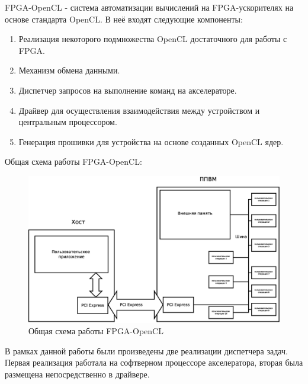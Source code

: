 FPGA-OpenCL - система автоматизации вычислений на FPGA-ускорителях на основе
 стандарта OpenCL. В неё входят следующие компоненты:
\begin{enumerate}
   \item Реализация некоторого подмножества OpenCL достаточного для работы с
   FPGA.
   \item Механизм обмена данными.
   \item Диспетчер запросов на выполнение команд на акселераторе.
   \item Драйвер для осуществления взаимодействия между устройством и
   центральным процессором.
   \item Генерация прошивки для устройства на основе созданных OpenCL ядер.
\end{enumerate}

Общая схема работы FPGA-OpenCL:

\begin{figure}[h!]
\includegraphics [width=\textwidth]{pictures/base-scheme}
\caption{Общая схема работы FPGA-OpenCL}
\label{fpga-cell}
\end{figure}

В рамках данной работы были произведены две реализации диспетчера задач. Первая
реализация работала на софтверном процессоре акселератора, вторая была размещена
непосредственно в драйвере.
